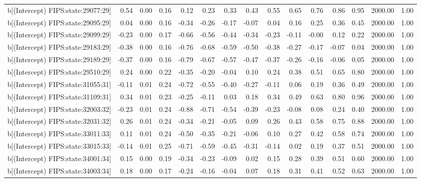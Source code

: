 \begin{table}[ht]
\begin{tabular}{rrrrrrrrrrrrrrr}
  b[(Intercept) FIPS:state:29077:29] & 0.54 & 0.00 & 0.16 & 0.12 & 0.23 & 0.33 & 0.43 & 0.55 & 0.65 & 0.76 & 0.86 & 0.95 & 2000.00 & 1.00 \\ 
  b[(Intercept) FIPS:state:29095:29] & 0.04 & 0.00 & 0.16 & -0.34 & -0.26 & -0.17 & -0.07 & 0.04 & 0.16 & 0.25 & 0.36 & 0.45 & 2000.00 & 1.00 \\ 
  b[(Intercept) FIPS:state:29099:29] & -0.23 & 0.00 & 0.17 & -0.66 & -0.56 & -0.44 & -0.34 & -0.23 & -0.11 & -0.00 & 0.12 & 0.22 & 2000.00 & 1.00 \\ 
  b[(Intercept) FIPS:state:29183:29] & -0.38 & 0.00 & 0.16 & -0.76 & -0.68 & -0.59 & -0.50 & -0.38 & -0.27 & -0.17 & -0.07 & 0.04 & 2000.00 & 1.00 \\ 
  b[(Intercept) FIPS:state:29189:29] & -0.37 & 0.00 & 0.16 & -0.79 & -0.67 & -0.57 & -0.47 & -0.37 & -0.26 & -0.16 & -0.06 & 0.05 & 2000.00 & 1.00 \\ 
  b[(Intercept) FIPS:state:29510:29] & 0.24 & 0.00 & 0.22 & -0.35 & -0.20 & -0.04 & 0.10 & 0.24 & 0.38 & 0.51 & 0.65 & 0.80 & 2000.00 & 1.00 \\ 
  b[(Intercept) FIPS:state:31055:31] & -0.11 & 0.01 & 0.24 & -0.72 & -0.55 & -0.40 & -0.27 & -0.11 & 0.06 & 0.19 & 0.36 & 0.49 & 2000.00 & 1.00 \\ 
  b[(Intercept) FIPS:state:31109:31] & 0.34 & 0.01 & 0.23 & -0.25 & -0.11 & 0.03 & 0.18 & 0.34 & 0.49 & 0.63 & 0.80 & 0.96 & 2000.00 & 1.00 \\ 
  b[(Intercept) FIPS:state:32003:32] & -0.23 & 0.01 & 0.24 & -0.88 & -0.71 & -0.54 & -0.39 & -0.23 & -0.08 & 0.08 & 0.24 & 0.40 & 2000.00 & 1.00 \\ 
  b[(Intercept) FIPS:state:32031:32] & 0.26 & 0.01 & 0.24 & -0.34 & -0.21 & -0.05 & 0.09 & 0.26 & 0.43 & 0.58 & 0.75 & 0.88 & 2000.00 & 1.00 \\ 
  b[(Intercept) FIPS:state:33011:33] & 0.11 & 0.01 & 0.24 & -0.50 & -0.35 & -0.21 & -0.06 & 0.10 & 0.27 & 0.42 & 0.58 & 0.74 & 2000.00 & 1.00 \\ 
  b[(Intercept) FIPS:state:33015:33] & -0.14 & 0.01 & 0.25 & -0.71 & -0.59 & -0.45 & -0.31 & -0.14 & 0.02 & 0.19 & 0.37 & 0.51 & 2000.00 & 1.00 \\ 
  b[(Intercept) FIPS:state:34001:34] & 0.15 & 0.00 & 0.19 & -0.34 & -0.23 & -0.09 & 0.02 & 0.15 & 0.28 & 0.39 & 0.51 & 0.60 & 2000.00 & 1.00 \\ 
  b[(Intercept) FIPS:state:34003:34] & 0.18 & 0.00 & 0.17 & -0.24 & -0.16 & -0.04 & 0.07 & 0.18 & 0.31 & 0.41 & 0.52 & 0.63 & 2000.00 & 1.00 \\ 

\end{tabular}
\end{table}
